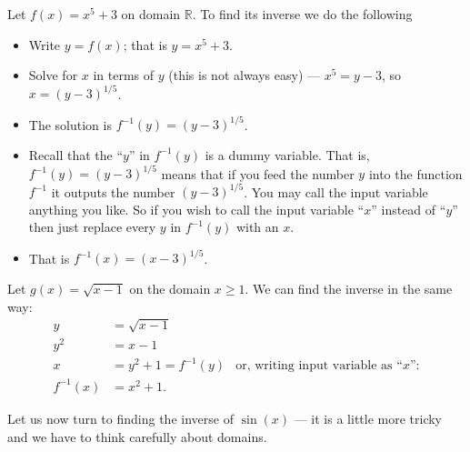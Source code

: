 \begin{eg}\label{eg_0_6_1}
Let $f(x)=x^5+3$ on domain $\mathbb{R}$. To find its inverse we do the following
\begin{itemize}
 \item Write $y=f(x)$; that is $y=x^5+3$.
 \item Solve for $x$ in terms of $y$ (this is not always easy) --- $x^5=y-3$, so
$x=(y-3)^{1/5}$.
\item The solution is $f^{-1}(y) = (y-3)^{1/5}$.
\item Recall that the ``$y$'' in $f^{-1}(y)$ is a dummy variable. That is,
$f^{-1}(y) = (y-3)^{1/5}$ means that if you feed the number $y$ into the function
$f^{-1}$ it outputs the number $(y-3)^{1/5}$. You may call the input variable anything
you like. So if you wish to call the input variable ``$x$'' instead of ``$y$'' then just
replace every $y$ in $f^{-1}(y)$ with an $x$.
\item That is $f^{-1}(x) = (x-3)^{1/5}$.
\end{itemize}
\end{eg}


\begin{eg}\label{eg_0_6_2}
Let $g(x) = \sqrt{x-1}$ on the domain $x \geq 1$. We can find the inverse in the same way:
\begin{align*}
  y &= \sqrt{x-1} \\
  y^2 &= x-1 \\
  x &= y^2+1 = f^{-1}(y) & \text{or, writing input variable as ``$x$'':} \\
  f^{-1}(x) &= x^2+1.
\end{align*}
\end{eg}

Let us now turn to finding the inverse of $\sin(x)$ --- it is a little more tricky and we
have to think carefully about domains.


